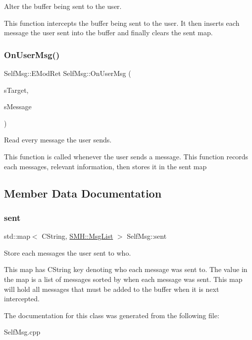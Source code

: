 Alter the buffer being sent to the user. 

This function intercepts the buffer being sent to the user. It then inserts each message the user sent into the buffer and finally clears the \textquotesingle{}sent\textquotesingle{} map. \mbox{\label{class_self_msg_ae86a578c56e20230f89d776e02b089d5}} 
\subsubsection{\texorpdfstring{On\+User\+Msg()}{OnUserMsg()}}
{\footnotesize\ttfamily Self\+Msg\+::\+E\+Mod\+Ret Self\+Msg\+::\+On\+User\+Msg (\begin{DoxyParamCaption}\item[{C\+String \&}]{s\+Target,  }\item[{C\+String \&}]{s\+Message }\end{DoxyParamCaption})\hspace{0.3cm}{\ttfamily [override]}}



Read every message the user sends. 

This function is called whenever the user sends a message. This function records each messages, relevant information, then stores it in the \textquotesingle{}sent\textquotesingle{} map 

\subsection{Member Data Documentation}
\mbox{\label{class_self_msg_ae2dc542caa1a3f5ae45e6de96d37cb22}} 
\subsubsection{\texorpdfstring{sent}{sent}}
{\footnotesize\ttfamily std\+::map$<$ C\+String, \hyperlink{namespace_s_m_h_a577a58a147f501590720badab28c2c98}{S\+M\+H\+::\+Msg\+List} $>$ Self\+Msg\+::sent\hspace{0.3cm}{\ttfamily [protected]}}



Store each messages the user sent to who. 

This map has C\+String key denoting who each message was sent to. The value in the map is a list of messages sorted by when each message was sent. This map will hold all messages that must be added to the buffer when it is next intercepted. 

The documentation for this class was generated from the following file\+:\begin{DoxyCompactItemize}
\item 
Self\+Msg.\+cpp\end{DoxyCompactItemize}
